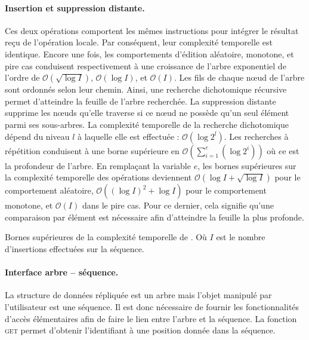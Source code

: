\paragraph{Insertion et suppression distante.} Ces deux opérations comportent
les mêmes instructions pour intégrer le résultat reçu de l'opération locale. Par
conséquent, leur complexité temporelle est identique. Encore une fois, les
comportements d'édition aléatoire, monotone, et pire cas conduisent
respectivement à une croissance de l'arbre exponentiel de l'ordre de
$\mathcal{O}(\sqrt{\log I})$, $\mathcal{O}(\log I)$, et $\mathcal{O}(I)$.  Les
fils de chaque nœud de l'arbre sont ordonnés selon leur chemin. Ainsi, une
recherche dichotomique récursive permet d'atteindre la feuille de l'arbre
recherchée. La suppression distante supprime les nœuds qu'elle traverse si ce
nœud ne possède qu'un seul élément parmi ses sous-arbres. La complexité
temporelle de la recherche dichotomique dépend du niveau $l$ à laquelle elle est
effectuée : $\mathcal{O}(\log 2^l)$. Les recherches à répétition conduisent à
une borne supérieure en
$\mathcal{O}(\textstyle\sum\nolimits_{i=1}^{e}(\log 2^i))$ où $e$e est la
profondeur de l'arbre. En remplaçant la variable $e$, les bornes supérieures sur
la complexité temporelle des opérations deviennent
$\mathcal{O}(\log I + \sqrt{\log I})$ pour le comportement aléatoire,
$\mathcal{O}((\log I)^2 + \log I)$ pour le comportement monotone, et
$\mathcal{O}(I)$ dans le pire cas. Pour ce dernier, cela signifie qu'une
comparaison par élément est nécessaire afin d'atteindre la feuille la plus
profonde.

\begin{table}
  \begin{center}
    \caption{\label{repl:table:lseqtime}
      Bornes supérieures de la complexité temporelle de \LSEQ. Où
      $I$ est le nombre d'insertions effectuées sur la séquence.}
    
  \end{center}
\end{table}


\paragraph{Interface arbre -- séquence.} La structure de données répliquée est
un arbre mais l'objet manipulé par l'utilisateur est une séquence. Il est donc
nécessaire de fournir les fonctionnalités d'accès élémentaires afin de faire le
lien entre l'arbre et la séquence.  La fonction \textsc{get} permet d'obtenir
l'identifiant à une position donnée dans la séquence.

